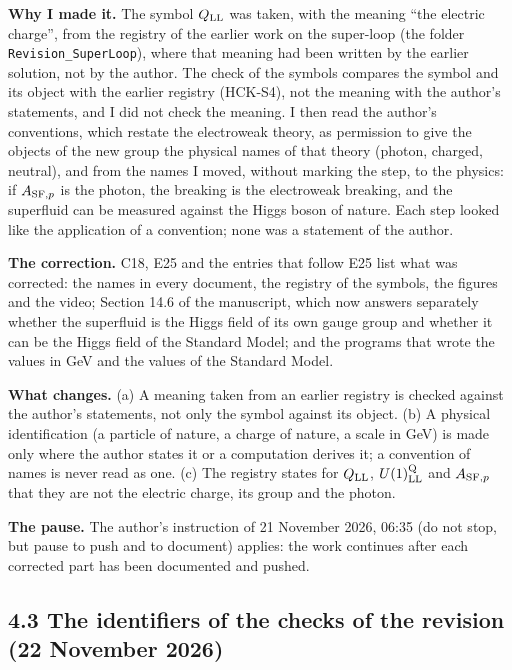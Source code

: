 \documentclass[
  10pt,
]{article}
\begin{document}
\textbf{Why I made it.} The symbol \(Q_{\rm LL}\) was taken, with the
meaning ``the electric charge'', from the registry of the earlier work
on the super-loop (the folder \texttt{Revision\_SuperLoop}), where that
meaning had been written by the earlier solution, not by the author. The
check of the symbols compares the symbol and its object with the earlier
registry (HCK-S4), not the meaning with the author's statements, and I
did not check the meaning. I then read the author's conventions, which
restate the electroweak theory, as permission to give the objects of the
new group the physical names of that theory (photon, charged, neutral),
and from the names I moved, without marking the step, to the physics: if
\(A_{{\rm SF},p}\) is the photon, the breaking is the electroweak
breaking, and the superfluid can be measured against the Higgs boson of
nature. Each step looked like the application of a convention; none was
a statement of the author.

\textbf{The correction.} C18, E25 and the entries that follow E25 list
what was corrected: the names in every document, the registry of the
symbols, the figures and the video; Section 14.6 of the manuscript,
which now answers separately whether the superfluid is the Higgs field
of its own gauge group and whether it can be the Higgs field of the
Standard Model; and the programs that wrote the values in GeV and the
values of the Standard Model.

\textbf{What changes.} (a) A meaning taken from an earlier registry is
checked against the author's statements, not only the symbol against its
object. (b) A physical identification (a particle of nature, a charge of
nature, a scale in GeV) is made only where the author states it or a
computation derives it; a convention of names is never read as one. (c)
The registry states for \(Q_{\rm LL}\), \(U(1)^{\rm Q}_{\rm LL}\) and
\(A_{{\rm SF},p}\) that they are not the electric charge, its group and
the photon.

\textbf{The pause.} The author's instruction of 21 November 2026, 06:35
(do not stop, but pause to push and to document) applies: the work
continues after each corrected part has been documented and pushed.

\hypertarget{the-identifiers-of-the-checks-of-the-revision-22-november-2026}{%
\subsection{4.3 The identifiers of the checks of the revision (22
November
2026)}\label{the-identifiers-of-the-checks-of-the-revision-22-november-2026}}
\end{document}
